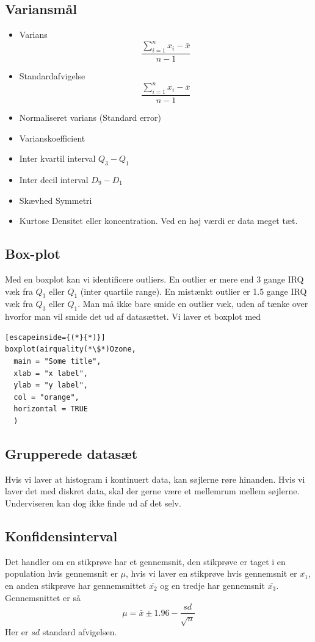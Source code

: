 \documentclass{article}
\begin{document}
\subsection{Variansmål}

\begin{itemize}
  \item Varians
    \subitem $$\frac{\sum^{n}_{i=1}x_i - \bar{x}}{n-1}$$
  \item Standardafvigelse
    \subitem $$\frac{\sum^{n}_{i=1}x_i - \bar{x}}{n-1}$$
  \item Normaliseret varians (Standard error) 
  \item Varianskoefficient
  \item Inter kvartil interval 
    \subitem $Q_3 - Q_1$
  \item Inter decil interval 
    \subitem $D_9-D_1$
  \item Skævhed
    \subitem Symmetri
  \item Kurtose
    \subitem Densitet eller koncentration. Ved en høj værdi er data meget tæt.
\end{itemize}

\subsection{Box-plot}
Med en boxplot kan vi identificere outliers. En outlier er mere end 3 gange IRQ
væk fra $Q_3$ eller $Q_1$ (inter quartile range). En mistænkt outlier er 1.5 gange IRQ
væk fra $Q_3$ eller $Q_1$.
Man må ikke bare smide en outlier væk, uden af tænke over hvorfor man vil smide
det ud af datasættet. Vi laver et boxplot med

\begin{lstlisting}[escapeinside={(*}{*)}]
boxplot(airquality(*\$*)Ozone,
  main = "Some title",
  xlab = "x label",
  ylab = "y label",
  col = "orange",
  horizontal = TRUE
  )
\end{lstlisting}

\subsection{Grupperede datasæt}
Hvis vi laver at histogram i kontinuert data, kan søjlerne røre hinanden. Hvis
vi laver det med diskret data, skal der gerne være et mellemrum mellem søjlerne.
Underviseren kan dog ikke finde ud af det selv.

\subsection{Konfidensinterval}
Det handler om en stikprøve har et gennemsnit, den stikprøve er
    taget i en population hvis gennemsnit er $\mu$, hvis vi laver en stikprøve
    hvis gennemsnit er $\bar{x_1}$, en anden stikprøve har gennemsnittet
    $\bar{x_2}$ og en tredje har gennemsnit $\bar{x_3}$. Gennemsnittet er så 
    $$\mu = \bar{x} \pm 1.96 - \frac{sd}{\sqrt{n}}  $$ Her er $sd$ standard
    afvigelsen.
    
\end{document}
